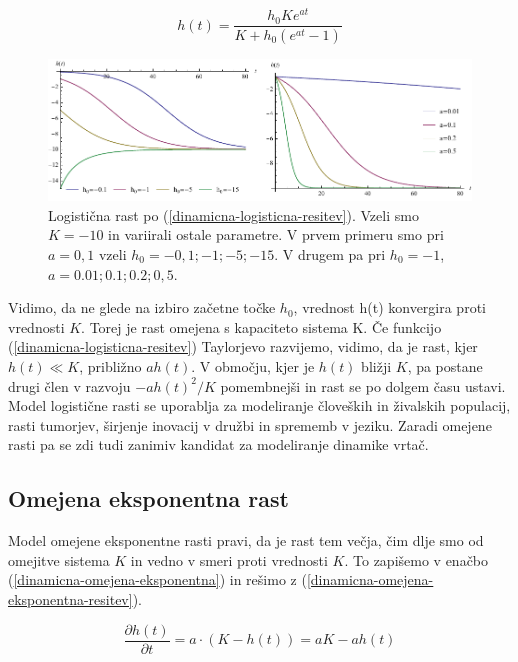 \documentclass[a4paper, twoside, 12pt]{book}
\begin{document}
    \begin{equation}
      h(t) = \frac{h_0 K e^{a t}}{K + h_0 (e^{a t}-1)}
      \label{dinamicna-logisticna-resitev}
    \end{equation}

    \begin{figure}[h]
      \begin{center}
        \includegraphics[width=14cm]{slike/logisticna-rast}
      \end{center}
      \caption{Logistična rast po (\ref{dinamicna-logisticna-resitev}). Vzeli smo $K=-10$ in variirali ostale parametre. V prvem primeru smo pri $a=0,1$ vzeli $h_0=-0,1;-1;-5;-15$. V drugem pa pri $h_0=-1$, $a=0.01;0.1;0.2;0,5$.}
      \label{fig:logisticna-rast}
    \end{figure}

    Vidimo, da ne glede na izbiro začetne točke $h_0$, vrednost h(t) konvergira proti vrednosti $K$. Torej je rast omejena s kapaciteto sistema K.
    Če funkcijo (\ref{dinamicna-logisticna-resitev}) Taylorjevo razvijemo, vidimo, da je rast, kjer $h(t) \ll K$, približno $a h(t)$. V območju, kjer je $h(t)$ bližji $K$, pa postane drugi člen v razvoju $-a h(t)^2 / K$ pomembnejši in rast se po dolgem času ustavi.
    Model logistične rasti se uporablja za modeliranje človeških in živalskih populacij, rasti tumorjev, širjenje inovacij v družbi in sprememb v jeziku. Zaradi omejene rasti pa se zdi tudi zanimiv kandidat za modeliranje dinamike vrtač.


    \subsection{Omejena eksponentna rast}

    Model omejene eksponentne rasti pravi, da je rast tem večja, čim dlje smo od omejitve sistema $K$ in vedno v smeri proti vrednosti $K$. To zapišemo v enačbo (\ref{dinamicna-omejena-eksponentna}) in rešimo z (\ref{dinamicna-omejena-eksponentna-resitev}).

    \begin{equation}
      \frac{\partial h(t)}{\partial t} = a \cdot ( K - h(t) ) = a K - a h(t)
      \label{dinamicna-omejena-eksponentna}
    \end{equation}
\end{document}
